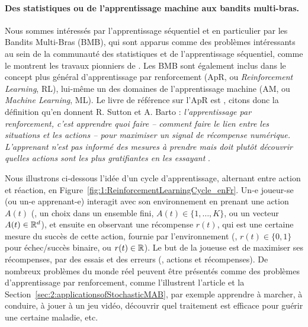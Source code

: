 \begin{resume_fr}
\paragraph{Des statistiques ou de l'apprentissage machine aux bandits multi-bras.}
%
Nous sommes intéressés par l'apprentissage séquentiel et en particulier par les Bandits Multi-Bras (BMB),
qui sont apparus comme des problèmes intéressants au sein de la communauté des statistiques et de l'apprentissage séquentiel, comme le montrent les travaux pionniers de \cite{Thompson33,Robbins52,LaiRobbins85}.
Les BMB sont également inclus dans le concept plus général d'apprentissage par renforcement (ApR, ou \emph{Reinforcement Learning}, RL), lui-même un des domaines de l'apprentissage machine (AM, ou \emph{Machine Learning}, ML).
%
Le livre de référence sur l'ApR est \cite{SuttonBarto2018}, citons donc la définition qu'en donnent R. Sutton et A. Barto :
\guillemotleft{} \emph{l'apprentissage par renforcement, c'est apprendre quoi faire -- comment faire le lien entre les situations et les actions -- pour maximiser un signal de récompense numérique. L'apprenant n'est pas informé des mesures à prendre mais doit plutôt découvrir quelles actions sont les plus gratifiantes en les essayant} \guillemotright.


Nous illustrons ci-dessous l'idée d'un cycle d'apprentissage, alternant entre action et réaction,
en Figure~\ref{fig:1:ReinforcementLearningCycle_enFr}.
Un-e joueur-se (ou un-e apprenant-e) interagit avec son environnement en prenant une action $A(t)$ (\eg, un choix dans un ensemble fini, $A(t)\in\{1,\dots,K\}$, ou un vecteur $A(t)\in\mathbb{R}^d$), et ensuite en observant une récompense $r(t)$, qui est une certaine mesure du succès de cette action, fournie par l'environnement (\eg, $r(t)\in\{0,1\}$ pour échec/succès binaire, ou $r(t)\in\mathbb{R}$).
Le but de la joueuse est de maximiser ses récompenses, par des essais et des erreurs (\ie, actions et récompenses).
De nombreux problèmes du monde réel peuvent être présentés comme des problèmes d'apprentissage par renforcement, comme l'illustrent l'article \cite{bouneffouf2019survey} et la Section~\ref{sec:2:applicationsofStochasticMAB}, par exemple apprendre à marcher, à conduire, à jouer à un jeu vidéo, découvrir quel traitement est efficace pour guérir une certaine maladie, etc.




\end{resume_fr}
